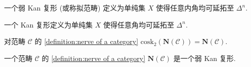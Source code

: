 \begin{definition}[弱 Kan 复形]
    一个弱 Kan 复形 (或称拟范畴) 定义为单纯集 \(X\) 使得任意内角均可延拓至 \(\Delta^n\).

    \begin{center}
    \end{center}
\end{definition}

\begin{definition}[Kan 复形]
    一个 Kan 复形定义为单纯集 \(X\) 使得任意角均可延拓至 \(\Delta^n\).
\end{definition}

\begin{lemma}
    对范畴 \(\mathcal{C}\) 的 \ref{definition:nerve of a category} \(\mathrm{cosk}_2 (\mathbf{N} (\mathcal{C})) = \mathbf{N} (\mathcal{C})\).
\end{lemma}

\begin{lemma}
    一个范畴 \(\mathcal{C}\) 的 \ref{definition:nerve of a category} \(\mathbf{N} (\mathcal{C})\) 是一个弱 Kan 复形.
\end{lemma}
